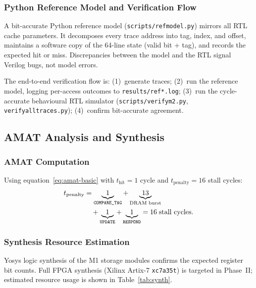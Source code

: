 \documentclass[conference]{IEEEtran}
\renewcommand{\_}{\textunderscore\allowbreak{}}
\begin{document}
\subsubsection{Python Reference Model and Verification Flow}

A bit-accurate Python reference model (\texttt{scripts/ref\_model.py})
mirrors all RTL cache parameters. It decomposes every trace address
into tag, index, and offset, maintains a software copy of the 64-line
state (valid bit + tag), and records the expected hit or miss.
Discrepancies between the model and the RTL signal Verilog bugs, not
model errors.

The end-to-end verification flow is: (1)~generate traces; (2)~run
the reference model, logging per-access outcomes to
\texttt{results/ref\_*.log}; (3)~run the cycle-accurate behavioural
RTL simulator (\texttt{scripts/verify\_m2.py},
\texttt{verify\_all\_traces.py}); (4)~confirm bit-accurate agreement.

\subsection{AMAT Analysis and Synthesis}
\label{sec:sol-e}

\subsubsection{AMAT Computation}

Using equation~\eqref{eq:amat-basic} with $t_{\mathrm{hit}} = 1$ cycle
and $t_{\mathrm{penalty}} = 16$ stall cycles:
\begin{align}
  t_{\mathrm{penalty}} &=
  \underbrace{1}_{\text{\scriptsize\texttt{COMPARE\_TAG}}} +
  \underbrace{13}_{\text{\scriptsize DRAM burst}} \notag \\
  &\quad +
  \underbrace{1}_{\text{\scriptsize\texttt{UPDATE}}} +
  \underbrace{1}_{\text{\scriptsize\texttt{RESPOND}}}
  = 16\;\text{stall cycles.}
  \label{eq:penalty}
\end{align}

\subsubsection{Synthesis Resource Estimation}

Yosys logic synthesis of the M1 storage modules confirms the expected
register bit counts. Full FPGA synthesis (Xilinx Artix-7
\texttt{xc7a35t}) is targeted in Phase~II; estimated resource usage is
shown in Table~\ref{tab:synth}.
\end{document}
